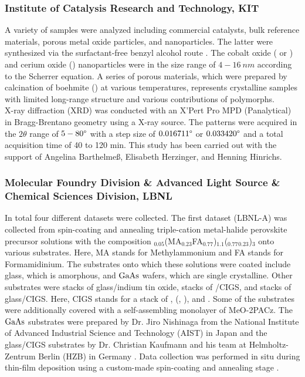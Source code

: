 \subsubsection*{Institute of Catalysis Research and Technology, KIT}

A variety of samples were analyzed including commercial catalysts, bulk reference materials, porous metal oxide particles, and nanoparticles. The latter were synthesized via the surfactant-free benzyl alcohol route \cite{Wolf2019, Wolf2018}. The cobalt oxide ( or ) and cerium oxide () nanoparticles were in the size range of $4-16 \ \si{nm}$ according to the Scherrer equation. A series of porous  materials, which were prepared by calcination of boehmite () at various temperatures, represents crystalline samples with limited long-range structure and various contributions of  polymorphs. \\

X-ray diffraction (XRD) was conducted with an X’Pert Pro MPD (Panalytical) in Bragg-Brentano geometry using a  X-ray source. The patterns were acquired in the $2\theta$ range of $5-80\degree$ with a step size of $0.016711\degree$ or $0.033420\degree$ and a total acquisition time of 40 to 120 min. This study has been carried out with the support of Angelina Barthelmeß, Elisabeth Herzinger, and Henning Hinrichs. \\

\subsubsection*{Molecular Foundry Division \& Advanced Light Source \& Chemical Sciences Division, LBNL}

In total four different datasets were collected. The first dataset (LBNL-A) was collected from spin-coating and annealing triple-cation metal-halide perovskite precursor solutions with the composition $_{0.05}$(MA$_{0.23}$FA$_{0.77}$)$_{1.1}$($_{0.77}$$_{0.23}$)$_{3}$ onto various substrates. Here, MA stands for Methylammonium and FA stands for Formamidinium. The substrates onto which these solutions were coated include glass, which is amorphous, and $\ce{GaAs}$ wafers, which are single crystalline. Other substrates were stacks of glass/indium tin oxide, stacks of /CIGS, and stacks of glass/CIGS. Here, CIGS stands for a stack of , (, ), and . Some of the substrates were additionally covered with a self-assembling monolayer of MeO-2PACz. The $\ce{GaAs}$ substrates were prepared by Dr. Jiro Nishinaga from the National Institute of Advanced Industrial Science and Technology (AIST) in Japan \cite{nishinaga2018} and the glass/CIGS substrates by Dr. Christian Kaufmann and his team at Helmholtz-Zentrum Berlin (HZB) in Germany \cite{heinemann2017}. Data collection was performed in situ during thin-film deposition using a custom-made spin-coating and annealing stage \cite{song2019}. 

